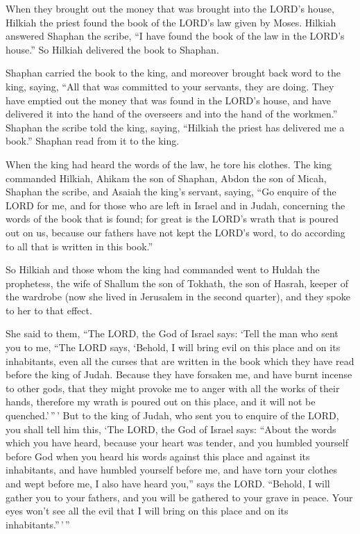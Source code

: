 When they brought out the money that was brought into
the LORD's house, Hilkiah the priest found the book of the LORD's law
given by Moses.  Hilkiah answered Shaphan the scribe, ``I
have found the book of the law in the LORD's house.'' So Hilkiah
delivered the book to Shaphan.

 Shaphan carried the book to the king, and moreover
brought back word to the king, saying, ``All that was committed to your
servants, they are doing.  They have emptied out the
money that was found in the LORD's house, and have delivered it into the
hand of the overseers and into the hand of the workmen.''
 Shaphan the scribe told the king, saying, ``Hilkiah the
priest has delivered me a book.'' Shaphan read from it to the king.

 When the king had heard the words of the law, he tore
his clothes.  The king commanded Hilkiah, Ahikam the son
of Shaphan, Abdon the son of Micah, Shaphan the scribe, and Asaiah the
king's servant, saying,  ``Go enquire of the LORD for me,
and for those who are left in Israel and in Judah, concerning the words
of the book that is found; for great is the LORD's wrath that is poured
out on us, because our fathers have not kept the LORD's word, to do
according to all that is written in this book.''

 So Hilkiah and those whom the king had commanded went to
Huldah the prophetess, the wife of Shallum the son of Tokhath, the son
of Hasrah, keeper of the wardrobe (now she lived in Jerusalem in the
second quarter), and they spoke to her to that effect.

 She said to them, ``The LORD, the God of Israel says:
`Tell the man who sent you to me,  ``The LORD says,
`Behold, I will bring evil on this place and on its inhabitants, even
all the curses that are written in the book which they have read before
the king of Judah.  Because they have forsaken me, and
have burnt incense to other gods, that they might provoke me to anger
with all the works of their hands, therefore my wrath is poured out on
this place, and it will not be quenched.'\,''\,'  But to
the king of Judah, who sent you to enquire of the LORD, you shall tell
him this, `The LORD, the God of Israel says: ``About the words which you
have heard,  because your heart was tender, and you
humbled yourself before God when you heard his words against this place
and against its inhabitants, and have humbled yourself before me, and
have torn your clothes and wept before me, I also have heard you,'' says
the LORD.  ``Behold, I will gather you to your fathers,
and you will be gathered to your grave in peace. Your eyes won't see all
the evil that I will bring on this place and on its
inhabitants.''\,'\,''

